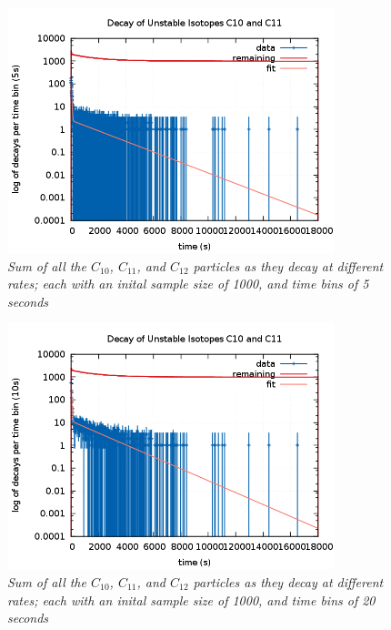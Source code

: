 \documentclass[11pt]{article}
\begin{document}
\begin{figure}[H]
  \begin{center}
\centerline{\includegraphics[width=3.75in]{unstabledecaybin5s.png}}
\caption{\it \small{Sum of all the $C_{10}$, $C_{11}$, and $C_{12}$ particles as they decay at different rates; each with an inital sample size of 1000, and time bins of 5 seconds \label{fig7}}}
  \end{center}
\end{figure}

\begin{figure}[H]
  \begin{center}
\centerline{\includegraphics[width=3.75in]{unstabledecaybin20s.png}}
\caption{\it \small{Sum of all the $C_{10}$, $C_{11}$, and $C_{12}$ particles as they decay at different rates; each with an inital sample size of 1000, and time bins of 20 seconds \label{fig8}}}
  \end{center}
\end{figure}
\end{document}
